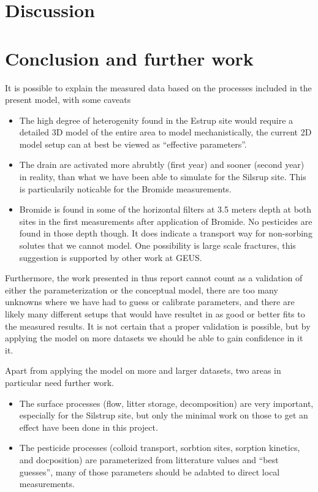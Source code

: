 \documentclass[a4paper]{article}
\begin{document}
\begin{text}
\section{Discussion}

\section{Conclusion and further work}

It is possible to explain the measured data based on the processes
included in the present model, with some caveats
\begin{itemize}
\item The high degree of heterogenity found in the Estrup site would
  require a detailed 3D model of the entire area to model
  mechanistically, the current 2D model setup can at best be viewed as
  ``effective parameters''.
\item The drain are activated more abrubtly (first year) and sooner
  (second year) in reality, than what we have been able to simulate
  for the Silsrup site.  This is particularily noticable for the
  Bromide measurements.  
\item Bromide is found in some of the horizontal filters at 3.5 meters
  depth at both sites in the first measurements after application of
  Bromide.  No pesticides are found in those depth though.  It does
  indicate a transport way for non-sorbing solutes that we cannot
  model.  One possibility is large scale fractures, this suggestion is
  supported by other work at GEUS.
\end{itemize}

Furthermore, the work presented in thus report cannot count as a
validation of either the parameterization or the conceptual model,
there are too many unknowns where we have had to guess or calibrate
parameters, and there are likely many different setups that would have
resultet in as good or better fits to the measured results.  It is not
certain that a proper validation is possible, but by applying the
model on more datasets we should be able to gain confidence in it it.

Apart from applying the model on more and larger datasets, two areas
in particular need further work.
\begin{itemize}
\item The surface processes (flow, litter storage, decomposition) are
  very important, especially for the Silstrup site, but only the
  minimal work on those to get an effect have been done in this project.
\item The pesticide processes (colloid transport, sorbtion sites,
  sorption kinetics, and docposition) are parameterized from
  litterature values and ``best guesses'', many of those parameters
  should be adabted to direct local measurements.
\end{itemize}
\end{text}
  
\end{document}

